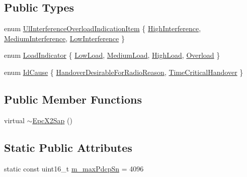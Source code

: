 \subsection*{Public Types}
\begin{DoxyCompactItemize}
\item 
enum \hyperlink{classns3_1_1EpcX2Sap_a4b1ca2b446488bf6f640c6cdce42aaf9}{Ul\+Interference\+Overload\+Indication\+Item} \{ \hyperlink{classns3_1_1EpcX2Sap_a4b1ca2b446488bf6f640c6cdce42aaf9a394299ce75c3b242ff353082fddd5d96}{High\+Interference}, 
\hyperlink{classns3_1_1EpcX2Sap_a4b1ca2b446488bf6f640c6cdce42aaf9aefe1ad983e9bec967a2d0adecda4083e}{Medium\+Interference}, 
\hyperlink{classns3_1_1EpcX2Sap_a4b1ca2b446488bf6f640c6cdce42aaf9ab287587c26a659f041d7356233c1b289}{Low\+Interference}
 \}
\item 
enum \hyperlink{classns3_1_1EpcX2Sap_a5de1a139dac453e4a55347721a8fc76f}{Load\+Indicator} \{ \hyperlink{classns3_1_1EpcX2Sap_a5de1a139dac453e4a55347721a8fc76fa4d074d22ad95470cb61569bd572e0e67}{Low\+Load}, 
\hyperlink{classns3_1_1EpcX2Sap_a5de1a139dac453e4a55347721a8fc76fa4a2dfde4adeda65d3684193997ffd5a6}{Medium\+Load}, 
\hyperlink{classns3_1_1EpcX2Sap_a5de1a139dac453e4a55347721a8fc76fa6f587a9f3c97608fc287a714bc6c67bf}{High\+Load}, 
\hyperlink{classns3_1_1EpcX2Sap_a5de1a139dac453e4a55347721a8fc76fa32a7788a69512af25effbfdc7fbc9dab}{Overload}
 \}
\item 
enum \hyperlink{classns3_1_1EpcX2Sap_aecbbca5ab8e21ca831d8ad02dada6d85}{Id\+Cause} \{ \hyperlink{classns3_1_1EpcX2Sap_aecbbca5ab8e21ca831d8ad02dada6d85a967926119f5907b728250f8f7abe9a2e}{Handover\+Desirable\+For\+Radio\+Reason}, 
\hyperlink{classns3_1_1EpcX2Sap_aecbbca5ab8e21ca831d8ad02dada6d85a8ef37e9e61e7776cf68421d2c5b96b5b}{Time\+Critical\+Handover}
 \}
\end{DoxyCompactItemize}
\subsection*{Public Member Functions}
\begin{DoxyCompactItemize}
\item 
virtual \hyperlink{classns3_1_1EpcX2Sap_a7cfb84dd5f970bd508c9ab5c698212d5}{$\sim$\+Epc\+X2\+Sap} ()
\end{DoxyCompactItemize}
\subsection*{Static Public Attributes}
\begin{DoxyCompactItemize}
\item 
static const uint16\+\_\+t \hyperlink{classns3_1_1EpcX2Sap_a41ff74ac24a6c9005d586f75cf366f95}{m\+\_\+max\+Pdcp\+Sn} = 4096
\end{DoxyCompactItemize}


